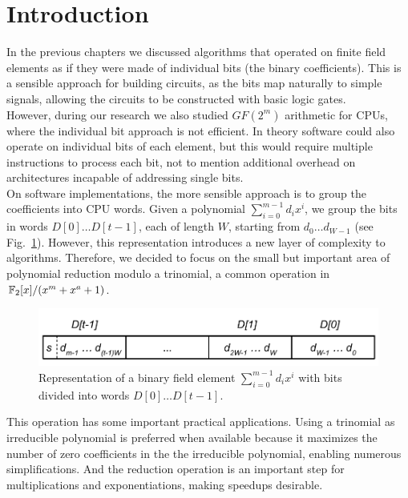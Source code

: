 \section{Introduction}

In the previous chapters we discussed algorithms that operated on finite field elements as if they were made of individual bits (the binary coefficients). This is a sensible approach for building circuits, as the bits map naturally to simple signals, allowing the circuits to be constructed with basic logic gates. \\

However, during our research we also studied $GF(2^m)$ arithmetic for CPUs, where the individual bit approach is not efficient. In theory software could also operate on individual bits of each element, but this would require multiple instructions to process each bit, not to mention additional overhead on architectures incapable of addressing single bits. \\

On software implementations, the more sensible approach is to group the coefficients into CPU words. Given a polynomial $\sum_{i=0}^{m-1} d_i x^i$, we group the bits in words $D[0] \ldots D[t-1]$, each of length $W$, starting from $d_0 \ldots d_{W-1}$ (see Fig.~\ref{fig:word:simple_words}). However, this representation introduces a new layer of complexity to algorithms. Therefore, we decided to focus on the small but important area of polynomial reduction modulo a trinomial, a common operation in $\mathbb{F}_2[x]/(x^m+x^a+1)$. \\

\begin{figure}
  \caption{Representation of a binary field element $\sum_{i=0}^{m-1} d_i x^i$ with bits divided into words $D[0] \ldots D[t-1]$.}
  \label{fig:word:simple_words}
  \centering
  \includegraphics[width = .90\columnwidth]{figures/element-word.pdf}
\end{figure}

This operation has some important practical applications. Using a trinomial as irreducible polynomial is preferred when available because it maximizes the number of zero coefficients in the the irreducible polynomial, enabling numerous simplifications. And the reduction operation is an important step for multiplications and exponentiations, making speedups desirable.\\

